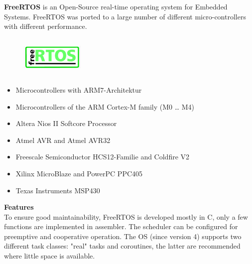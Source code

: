 \textbf{FreeRTOS} is an Open-Source  real-time operating system for Embedded Systems. FreeRTOS was ported to a large number  of different micro-controllers with different performance.

 	\begin{figure}[h]
    \centering
    \includegraphics[width=3cm, height=2cm]{Images/image129.png}
    \label{fig:Fig 80}
    \end{figure}
    
\begin{itemize}
\item  Microcontrollers with ARM7-Architektur
\item  Microcontrollers of the ARM Cortex-M family (M0 {\dots} M4)
\item  Altera Nios II Softcore Processor
\item  Atmel AVR and Atmel AVR32
\item  Freescale Semiconductor HCS12-Familie and Coldfire V2
\item  Xilinx MicroBlaze and PowerPC PPC405
\item  Texas Instruments MSP430
\end{itemize}

\textbf{Features}\\

To ensure good maintainability, FreeRTOS is developed mostly in C, only a few functions are implemented in assembler. The scheduler can be configured for preemptive and cooperative operation. The OS (since version 4) supports two different task classes: "real" tasks and coroutines, the latter are recommended where little space is available.\\


